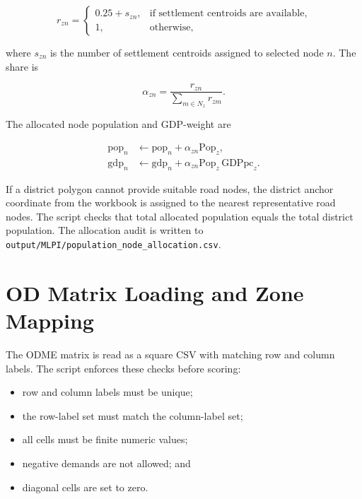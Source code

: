\documentclass[11pt,a4paper]{article}
\begin{document}
\begin{equation}
r_{zn} =
\begin{cases}
0.25+s_{zn}, & \text{if settlement centroids are available},\\
1, & \text{otherwise},
\end{cases}
\label{eq:mlpi-allocation-raw}
\end{equation}

where $s_{zn}$ is the number of settlement centroids assigned to selected node
$n$. The share is

\begin{equation}
\alpha_{zn}=\frac{r_{zn}}{\sum_{m\in N_z} r_{zm}}.
\label{eq:mlpi-allocation-share}
\end{equation}

The allocated node population and GDP-weight are

\begin{align}
\mathrm{pop}_n &\leftarrow \mathrm{pop}_n+\alpha_{zn}\mathrm{Pop}_z,\\
\mathrm{gdp}_n &\leftarrow \mathrm{gdp}_n+
\alpha_{zn}\mathrm{Pop}_z\,\mathrm{GDPpc}_z .
\label{eq:mlpi-node-gdp}
\end{align}

If a district polygon cannot provide suitable road nodes, the district anchor
coordinate from the workbook is assigned to the nearest representative road
nodes. The script checks that total allocated population equals the total
district population. The allocation audit is written to
\texttt{output/MLPI/population\_node\_allocation.csv}.

\section{OD Matrix Loading and Zone Mapping}

The ODME matrix is read as a square CSV with matching row and column labels.
The script enforces these checks before scoring:

\begin{itemize}
    \item row and column labels must be unique;
    \item the row-label set must match the column-label set;
    \item all cells must be finite numeric values;
    \item negative demands are not allowed; and
    \item diagonal cells are set to zero.
\end{itemize}
\end{document}
